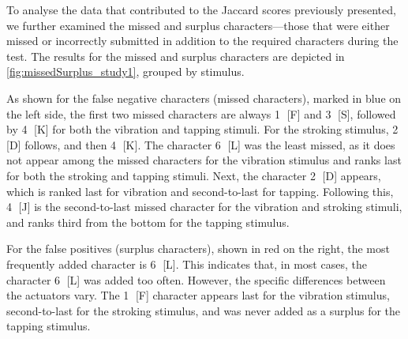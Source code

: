 To analyse the data that contributed to the Jaccard scores previously presented, we further examined the missed and surplus characters—those that were either missed or incorrectly submitted in addition to the required characters during the test. 
The results for the missed and surplus characters are depicted in \autoref{fig:missedSurplus_study1}, grouped by stimulus.

As shown for the false negative characters (missed characters), marked in blue on the left side, the first two missed characters are always \textcircled{1} [F] and \textcircled{3} [S], followed by \textcircled{4} [K] for both the vibration and tapping stimuli. 
For the stroking stimulus, \textcircled{2} [D] follows, and then \textcircled{4} [K]. 
The character \textcircled{6} [L] was the least missed, as it does not appear among the missed characters for the vibration stimulus and ranks last for both the stroking and tapping stimuli. 
Next, the character \textcircled{2} [D] appears, which is ranked last for vibration and second-to-last for tapping. 
Following this, \textcircled{4} [J] is the second-to-last missed character for the vibration and stroking stimuli, and ranks third from the bottom for the tapping stimulus.

For the false positives (surplus characters), shown in red on the right, the most frequently added character is \textcircled{6} [L]. 
This indicates that, in most cases, the character \textcircled{6} [L] was added too often. However, the specific differences between the actuators vary. 
The \textcircled{1} [F] character appears last for the vibration stimulus, second-to-last for the stroking stimulus, and was never added as a surplus for the tapping stimulus.



